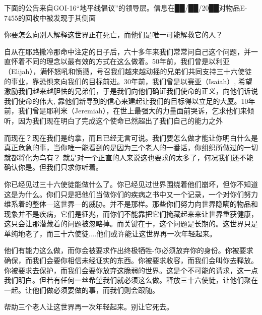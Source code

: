 


下面的公告来自GOI-16“地平线倡议”的领导层。信息在██/██/20██对物品E-7455的回收中被发现于其侧面

\begin{scpbox}

你要怎么向别人解释这世界正在死亡，而他们是唯一可能解救它的人？

自从在耶路撒冷那命中注定的日子后，六十多年来我们常常问自己这个问题，并一直怀着不同的理念以最有效的方式在这么做着。50年前，我们曾是以利亚（Elijah），满怀怒吼和愤懑，号召我们越来越动摇的兄弟们共同支持三十六使徒的事业，靠恐惧来向我们的目标前进。30年前，我们曾是以赛亚（Isaiah）, 希望激励我们越来越胆怯的兄弟们，于是我们向他们确证我们使命的正义，向他们诉说我们使命的伟大, 靠他们新寻到的信心来建起让我们的目标得以立足的大厦。10年前，我们曾是耶利米（Jeremiah），在世上最强大的力量面前哭诉，乞求他们来倾听，因为我们现在明白了完成这个使命已然超出了我们自己的能力之外

而现在？现在我们是约拿，而且已经无言可说。我们要怎么做才能让你明白什么是真正危急的事，当你唯一能看到的是因为三个老人的一番话，你组织所做过的一切就都将化为乌有？ 就是对一个正直的人来说这也要求的太多了，何况我们还不能确认你是。但我们只求你听着。

你已经见过三十六使徒能做什么了。你已经见过世界围绕着他们崩坏，但你不知道这是为什么。你们只是把他们当做你们的疾病之书中又一个记录，一个对你们努力维系着的整体—这世界—的威胁。并不是那样。那些你们努力向世界隐瞒的物品和现象并不是疾病，它们是征兆，而你们不能靠把它们掩藏起来来让世界重获健康，这只会让那潜藏着的问题被忽略掉。而关键在于，这个问题是长期的。这世界只是单纯地老了，而三十六使徒....他们或许能让这世界再一次年轻起来。

他们有能力这么做，而你会被要求作出终极牺牲-你必须放弃你的身份。你被要求确保，而我们会要你相信未经证实的东西。你被要求收容，而我们会叫你去释放。你被要求去保护，而我们会要你放弃这脆弱的世界。这是个不可能的请求，这一点我们明白。但若有任何一丝希望我们就必须这么做。释放三十六使徒，让他们聚在一起。让他们做必须要做的事，而我们则会跟随。

帮助三个老人让这世界再一次年轻起来。别让它死去。

\end{scpbox}
